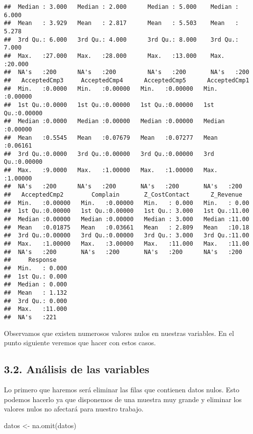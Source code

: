 \documentclass[
]{article}
\newenvironment{Shaded}{\begin{snugshade}}{\end{snugshade}}
\newcommand{\FunctionTok}[1]{\textcolor[rgb]{0.00,0.00,0.00}{#1}}
\newcommand{\NormalTok}[1]{#1}
\newcommand{\OtherTok}[1]{\textcolor[rgb]{0.56,0.35,0.01}{#1}}
\begin{document}
\begin{verbatim}
##  Median : 3.000   Median : 2.000      Median : 5.000    Median : 6.000   
##  Mean   : 3.929   Mean   : 2.817      Mean   : 5.503    Mean   : 5.278   
##  3rd Qu.: 6.000   3rd Qu.: 4.000      3rd Qu.: 8.000    3rd Qu.: 7.000   
##  Max.   :27.000   Max.   :28.000      Max.   :13.000    Max.   :20.000   
##  NA's   :200      NA's   :200         NA's   :200       NA's   :200      
##   AcceptedCmp3     AcceptedCmp4      AcceptedCmp5      AcceptedCmp1    
##  Min.   :0.0000   Min.   :0.00000   Min.   :0.00000   Min.   :0.00000  
##  1st Qu.:0.0000   1st Qu.:0.00000   1st Qu.:0.00000   1st Qu.:0.00000  
##  Median :0.0000   Median :0.00000   Median :0.00000   Median :0.00000  
##  Mean   :0.5545   Mean   :0.07679   Mean   :0.07277   Mean   :0.06161  
##  3rd Qu.:0.0000   3rd Qu.:0.00000   3rd Qu.:0.00000   3rd Qu.:0.00000  
##  Max.   :9.0000   Max.   :1.00000   Max.   :1.00000   Max.   :1.00000  
##  NA's   :200      NA's   :200       NA's   :200       NA's   :200      
##   AcceptedCmp2        Complain       Z_CostContact      Z_Revenue    
##  Min.   :0.00000   Min.   :0.00000   Min.   : 0.000   Min.   : 0.00  
##  1st Qu.:0.00000   1st Qu.:0.00000   1st Qu.: 3.000   1st Qu.:11.00  
##  Median :0.00000   Median :0.00000   Median : 3.000   Median :11.00  
##  Mean   :0.01875   Mean   :0.03661   Mean   : 2.809   Mean   :10.18  
##  3rd Qu.:0.00000   3rd Qu.:0.00000   3rd Qu.: 3.000   3rd Qu.:11.00  
##  Max.   :1.00000   Max.   :3.00000   Max.   :11.000   Max.   :11.00  
##  NA's   :200       NA's   :200       NA's   :200      NA's   :200    
##     Response     
##  Min.   : 0.000  
##  1st Qu.: 0.000  
##  Median : 0.000  
##  Mean   : 1.132  
##  3rd Qu.: 0.000  
##  Max.   :11.000  
##  NA's   :221
\end{verbatim}

Observamos que existen numerosos valores nulos en nuestras variables. En
el punto siguiente veremos que hacer con estos casos.

\hypertarget{anuxe1lisis-de-las-variables}{%
\subsection{3.2. Análisis de las
variables}\label{anuxe1lisis-de-las-variables}}

Lo primero que haremos será eliminar las filas que contienen datos
nulos. Esto podemos hacerlo ya que disponemos de una muestra muy grande
y eliminar los valores nulos no afectará para nuestro trabajo.

\begin{Shaded}
\begin{Highlighting}[]
\NormalTok{datos }\OtherTok{\textless{}{-}} \FunctionTok{na.omit}\NormalTok{(datos)}
\end{Highlighting}
\end{Shaded}
\end{document}
